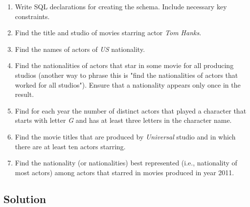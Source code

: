 \begin{enumerate}

\item
Write SQL declarations for creating the schema.
Include necessary key constraints.

\item
Find the title and studio of movies starring actor \textit{Tom Hanks}.

\item
Find the names of actors of \textit{US} nationality.

\item
Find the nationalities of actors that star in some movie for all producing studios (another way to phrase this is "find the nationalities of actors that worked for all studios").
Ensure that a nationality appears only once in the result.

\item
Find for each year the number of distinct actors that played a character that starts with letter \textit{G} and has at least three letters in the character name.

\item
Find the movie titles that are produced by \textit{Universal} studio and in which there are at least ten actors starring.

\item
Find the nationality (or nationalities) best represented (i.e., nationality of most actors) among actors that starred in movies produced in year 2011.

\end{enumerate}

\subsection*{Solution}

\lstset{language=sql}

